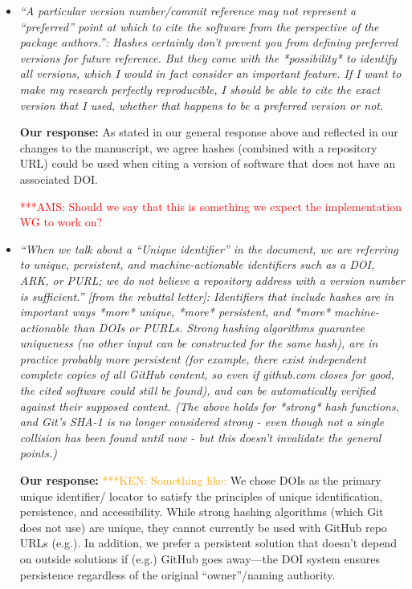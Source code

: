 \documentclass{article}
\newcommand{\niemnote}[1]{ {\textcolor{orange} { ***KEN: #1 }}} %
\newcommand{\asnote}[1]{ {\textcolor{red} { ***AMS: #1 }}} %
\begin{document}
\begin{enumerate}
\begin{itemize}
\item \emph{``A particular version number/commit reference may not represent a
``preferred'' point at which to cite the software from the perspective of the
package authors.'': Hashes certainly don't prevent you from defining preferred
versions for future reference. But they come with the *possibility* to identify
all versions, which I would in fact consider an important feature. If I want to
make my research perfectly reproducible, I should be able to cite the exact
version that I used, whether that happens to be a preferred version or not.}

\textbf{Our response:}
As stated in our general response above and reflected in our changes to the
manuscript, we agree hashes (combined with a
repository URL) could be used when citing a version of software that does not
have an associated DOI.

\asnote{Should we say that this is something we expect the implementation WG to
work on?}


\item \emph{``When we talk about a ``Unique identifier'' in the document, we
are referring to unique, persistent, and machine-actionable identifiers such as
a DOI, ARK, or PURL; we do not believe a repository address with a version
number is sufficient.'' [from the rebuttal letter]: Identifiers that include
hashes are in important ways *more* unique, *more* persistent, and *more*
machine-actionable than DOIs or PURLs. Strong hashing algorithms guarantee
uniqueness (no other input can be constructed for the same hash), are in
practice probably more persistent (for example, there exist independent
complete copies of all GitHub content, so even if github.com closes for good,
the cited software could still be found), and can be automatically verified
against their supposed content. (The above holds for *strong* hash functions,
and Git's SHA-1 is no longer considered strong - even though not a single
collision has been found until now - but this doesn't invalidate the general
points.)}

\textbf{Our response:}
\niemnote{Something like:} We chose DOIs as the primary unique identifier\slash
locator to satisfy the principles of unique identification, persistence, and
accessibility. While strong hashing algorithms (which Git does not use) are
unique, they cannot currently be used with GitHub repo URLs (e.g.). In addition,
we prefer a persistent solution that doesn't depend on outside solutions if
(e.g.) GitHub goes away---the DOI system ensures persistence regardless of the
original ``owner''\slash naming authority.

\end{itemize}

\end{enumerate}

%
%
\end{document}
